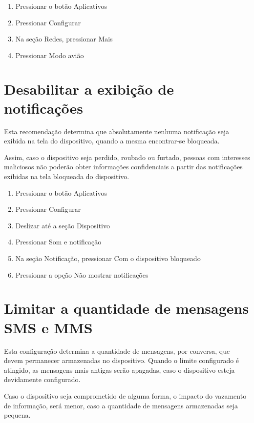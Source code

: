 \begin{enumerate}
\item Pressionar o bot\~ao Aplicativos
\item Pressionar Configurar
\item Na se\c c\~ao Redes, pressionar Mais
\item Pressionar Modo avi\~ao
\end{enumerate}

\section{Desabilitar a exibi\c c\~ao de notifica\c c\~oes}

Esta recomenda\c c\~ao determina que absolutamente nenhuma notifica\c c\~ao seja exibida na tela do dispositivo, quando a mesma encontrar-se bloqueada. 

Assim, caso o dispositivo seja perdido, roubado ou furtado, pessoas com interesses maliciosos n\~ao poder\~ao obter informa\c c\~oes confidenciais a partir das notifica\c c\~oes exibidas na tela bloqueada do dispositivo.

\begin{enumerate}
\item Pressionar o bot\~ao Aplicativos
\item Pressionar Configurar 
\item Deslizar at\'e a se\c c\~ao Dispositivo
\item Pressionar Som e notifica\c c\~ao
\item Na se\c c\~ao Notifica\c c\~ao, pressionar Com o dispositivo bloqueado
\item Pressionar a op\c c\~ao N\~ao mostrar notifica\c c\~oes
\end{enumerate}

\section{Limitar a quantidade de mensagens SMS e MMS}

Esta configura\c c\~ao determina a quantidade de mensagens, por conversa, que devem permanecer armazenadas no dispositivo. Quando o limite configurado \'e atingido, as mensagens mais antigas ser\~ao apagadas, caso o dispositivo esteja devidamente configurado.

Caso o dispositivo seja comprometido de alguma forma, o impacto do vazamento de informa\c c\~ao, ser\'a menor, caso a quantidade de mensagens armazenadas seja pequena.

